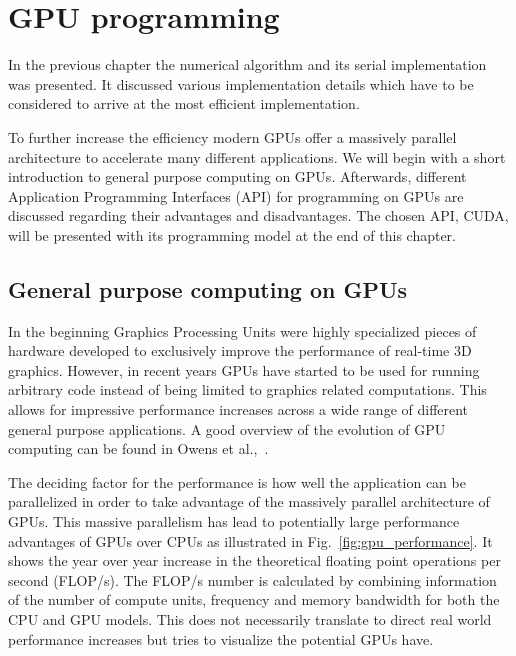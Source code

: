 \chapter{GPU programming}
\label{cha:gpu_programming}

In the previous chapter the numerical algorithm and its serial implementation was presented. It discussed various implementation details which have to be considered to arrive at the most efficient implementation.

To further increase the efficiency modern GPUs offer a massively parallel architecture to accelerate many different applications. We will begin with a short introduction to general purpose computing on GPUs. Afterwards, different Application Programming Interfaces (API) for programming on GPUs are discussed regarding their advantages and disadvantages. The chosen API, CUDA, will be presented with its programming model at the end of this chapter.

\section{General purpose computing on GPUs}
In the beginning Graphics Processing Units were highly specialized pieces of hardware developed to exclusively improve the performance of real-time 3D graphics. However, in recent years GPUs have started to be used for running arbitrary code instead of being limited to graphics related computations. This allows for impressive performance increases across a wide range of different general purpose applications. A good overview of the evolution of GPU computing can be found in Owens et al.,~\cite{Owens2008}.

The deciding factor for the performance is how well the application can be parallelized in order to take advantage of the massively parallel architecture of GPUs. This massive parallelism has lead to potentially large performance advantages of GPUs over CPUs as illustrated in Fig.~\ref{fig:gpu_performance}. It shows the year over year increase in the theoretical floating point operations per second (FLOP/s). The FLOP/s number is calculated by combining information of the number of compute units, frequency and memory bandwidth for both the CPU and GPU models. This does not necessarily translate to direct real world performance increases but tries to visualize the potential GPUs have.

